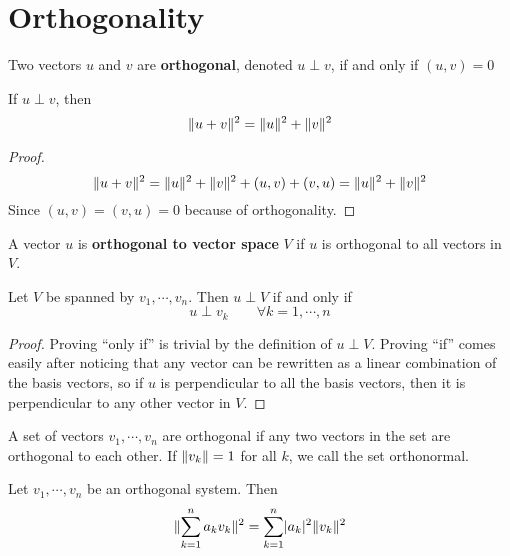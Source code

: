 \section{Orthogonality} 
\begin{definition}
Two vectors $u$ and $v$ are \textbf{orthogonal}, denoted $u \perp v$, if and only if $(u, v) = 0$
\end{definition}

\begin{theorem}
If $u \perp v$, then 
$$\lVert u + v\rVert^{2} = \lVert u\rVert^{2} + \lVert v\rVert^{2}$$
\end{theorem}

\begin{proof}
$$\lVert u + v\rVert^{2} = \lVert u\rVert^{2} + \lVert v\rVert^{2} + (u, v) + (v, u) = \lVert u\rVert^{2} + \lVert v\rVert^{2}$$
Since $(u,v) = (v, u) = 0$ because of orthogonality. 
\end{proof}

\begin{definition}
A vector $u$ is \textbf{orthogonal to vector space} $V$ if $u$ is orthogonal to all vectors in $V$. 
\end{definition}

\begin{theorem}
Let $V$ be spanned by $v_{1}, \cdots, v_{n}$. Then $u \perp V$ if and only if 
$$u \perp v_{k} \qquad \forall k = 1, \cdots, n$$
\end{theorem}

\begin{proof}
Proving ``only if'' is trivial by the definition of $u \perp V$. Proving ``if'' comes easily after noticing that any vector can be rewritten as a linear combination of the basis vectors, so if $u$ is perpendicular to all the basis vectors, then it is perpendicular to any other vector in $V$. 
\end{proof}

\begin{definition}
A set of vectors $v_{1}, \cdots, v_{n}$ are orthogonal if any two vectors in the set are orthogonal to each other. If $\lVert v_{k}\rVert = 1$ for all $k$, we call the set orthonormal. 
\end{definition}

\begin{lemma}
Let $v_{1}, \cdots, v_{n}$ be an orthogonal system. Then 
$$\lVert\sum_{k=1}^{n} a_{k} v_{k}\rVert^{2} = \sum_{k=1}^{n} \lvert a_{k}\rvert^{2} \lVert v_{k}\rVert^{2}$$
\end{lemma}

